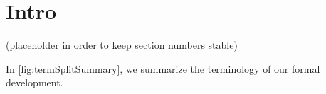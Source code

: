 \documentclass[pldi,preprint]{sigplanconf}
\begin{document}


\section{Intro}
(placeholder in order to keep section numbers stable)

In \ref{fig:termSplitSummary}, we summarize the terminology of our
formal development.
















\end{document}
